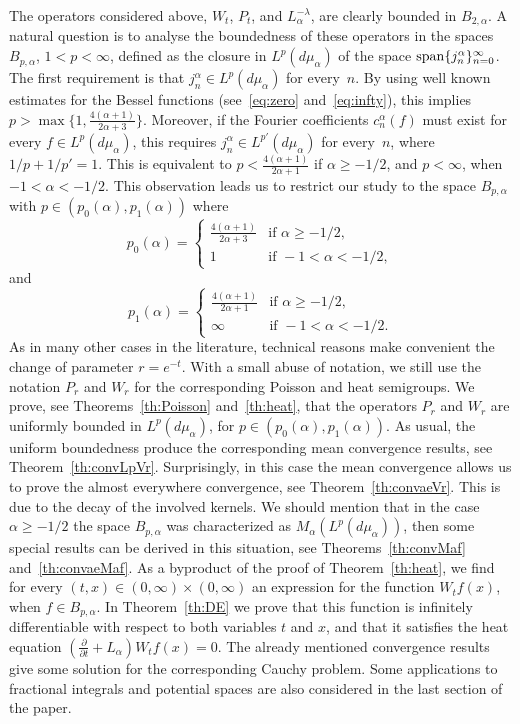 \documentclass[11pt,a4paper]{amsart}
\newcommand{\ma}{M_{\alpha}}
\newcommand{\mua}{d\mu_\alpha}
\newcommand{\jna}{j_n^{\alpha}}
\newcommand{\cna}{c_n^{\alpha}}
\newcommand{\spa}{\operatornamewithlimits{span}} %
\theoremstyle{plain}
\theoremstyle{remark}
\begin{document}
The operators considered above, $W_t$, $P_t$, and $L_\alpha^{-\lambda}$, are clearly bounded in $B_{2,\alpha}$. A natural question is to analyse the boundedness of these operators in the spaces $B_{p,\alpha}$, $1<p<\infty$, defined as the closure in $L^p(\mua)$ of the space $\spa\{\jna\}_{n=0}^\infty$.
The first requirement is that $\jna \in L^p(\mua)$ for every~$n$. 
By using well known estimates for the Bessel functions (see~\eqref{eq:zero} and~\eqref{eq:infty}), this implies $p > \max\{1,\frac{4(\alpha+1)}{2\alpha+3}\}$. Moreover, if the Fourier coefficients $\cna(f)$
must exist for every $f \in L^p(\mua)$, this requires $\jna \in L^{p'}(\mua)$ for every~$n$, where $1/p+1/p'=1$. This is equivalent to $p < \frac{4(\alpha+1)}{2\alpha+1}$ if $\alpha\ge-1/2$, and $p < \infty$, when $-1 < \alpha < -1/2$. This observation leads us to restrict our study to the space $B_{p,\alpha}$ with $p \in (p_0(\alpha), p_1(\alpha))$ where 
\[
  p_0(\alpha) =
  \begin{cases}
    \frac{4(\alpha+1)}{2\alpha+3} & \text{if } \alpha \ge -1/2,\\
    1 & \text{if } -1 < \alpha<-1/2,
  \end{cases}
\]
and
\[
  p_1(\alpha) =
  \begin{cases}
    \frac{4(\alpha+1)}{2\alpha+1} & \text{if } \alpha \ge -1/2,\\
    \infty & \text{if } -1 < \alpha<-1/2.
  \end{cases}
\]
As in many other cases in the literature, technical reasons make convenient the change of parameter $r=e^{-t}$. With a small abuse of notation, we still use the notation $P_r$ and $W_r$ for the corresponding Poisson and heat semigroups. We prove, see Theorems~\ref{th:Poisson} and~\ref{th:heat}, that the operators $P_r$ and $W_r$ 
are uniformly bounded in $L^p(\mua)$, for $p \in (p_0(\alpha), p_1(\alpha))$.
As usual, the uniform boundedness produce the corresponding mean
convergence results, see Theorem~\ref{th:convLpVr}. 
Surprisingly, in this case the mean convergence allows us to prove the almost everywhere convergence, see Theorem~\ref{th:convaeVr}. This is due to the decay of the involved kernels.
We should mention that in the case $\alpha \ge -1/2$ the space $B_{p,\alpha}$ was characterized as $\ma(L^p(\mua))$, then some special results can be derived in this situation, see Theorems~\ref{th:convMaf} and~\ref{th:convaeMaf}. As a byproduct of the proof of Theorem~\ref{th:heat}, we find for every $(t,x)\in (0,\infty)\times(0,\infty)$ an expression for the function $W_t f(x)$, when $f\in B_{p,\alpha}$. In Theorem~\ref{th:DE} we prove that this function is infinitely differentiable with respect to both variables $t$ and $x$, and that it satisfies the heat equation $\left( \frac{\partial}{\partial t} + L_\alpha \right) W_t f(x) = 0$. The already mentioned convergence results give some solution for the corresponding Cauchy problem. Some applications to fractional integrals and potential spaces are also considered in the last section of the paper.
 
\end{document}

